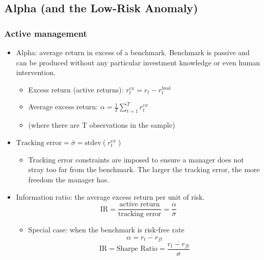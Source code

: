 \subsection{Alpha (and the Low-Risk Anomaly)}


\subsubsection{Active management}
\begin{itemize}
\item Alpha: average return in excess of a benchmark. Benchmark is passive and can be produced without any particular investment knowledge or even human intervention.
    \begin{itemize}
    \item Excess return (active returns): \( r_t^{ex} = r_t - r_t^{bmk} \)

    \item Average excess return:
    \(
    \alpha = \frac{1}{T} \sum_{t = 1}^{T} r_t^{ex}
    \)
    \item (where there are T observations in the sample)
    \end{itemize}
\item \(\text{Tracking error} = \bar{\sigma} = \text{stdev}(r_t^{ex})\)
    \begin{itemize}
    \item Tracking error constraints are imposed to ensure a manager does not stray too far from the benchmark. The larger the tracking error, the more freedom the manager has.
    \end{itemize}

\item Information ratio: the average excess return per unit of risk.
\[
\text{IR} = \frac{\text{active return}}{\text{tracking error}} = \frac{\alpha}{\bar{\sigma}}
\]
    \begin{itemize}
    \item Special case: when the benchmark is risk-free rate
    \[
\alpha = \overline{r_t - r_{ft}}
\]
\[
\text{IR} = \text{Sharpe Ratio} = \frac{\overline{r_t - r_{ft}}}{\sigma}
\]


\end{itemize}
\end{itemize}
